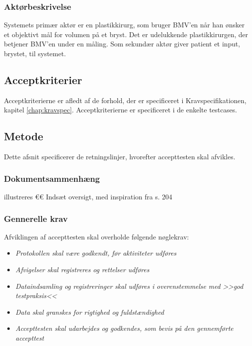 		\subsubsection{Aktørbeskrivelse}
		Systemets primær aktør er en plastikkirurg, som bruger BMV'en når han ønsker et objektivt mål for volumen på et bryst. Det er udelukkende plastikkirurgen, der  betjener BMV'en under en måling. Som sekundær aktør giver patient et input, brystet, til systemet.
		
		\subsection{Acceptkriterier}
		Acceptkriterierne er afledt af de forhold, der er specificeret i Kravspecifikationen, kapitel \ref{chap:kravspec}. Acceptkriterierne er specificeret i de enkelte testcases. 
		
		\subsection{Metode}
		Dette afsnit specificerer de retningslinjer, hvorefter accepttesten skal afvikles. 
		
			\subsubsection{Dokumentsammenhæng}
			illustreres 
			€€ Indsæt oversigt, med inspiration fra s. 204 	
			
			\subsubsection{Gennerelle krav}
			Afviklingen af accepttesten skal overholde følgende nøglekrav: 
			
			\begin{itemize}
				\item \textit{Protokollen skal være godkendt, før aktiviteter udføres}
				\item \textit{Afvigelser skal registreres og rettelser udføres}
				\item \textit{Dataindsamling og registreringer skal udføres i overenstemmelse med >>god testpraksis<< }
				\item \textit{Data skal granskes for rigtighed og fuldstændighed }
				\item \textit{Accepttesten skal udarbejdes og godkendes, som bevis på den gennemførte accepttest}
			\end{itemize}
			
